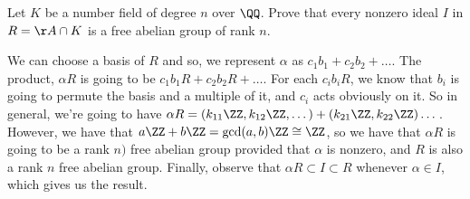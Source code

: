\begin{problem}
Let \(K\) be a number field of degree \(n\) over \(\QQ\). Prove that every nonzero ideal \(I\) in \(R = \AA \cap K\) is a free abelian group of rank \(n\).
\end{problem}
We can choose a basis of \(R\) and so, we represent \(\alpha\) as \(c_1b_1+c_2b_2+ \dots\). The product, \(\alpha R\) is going to be \(c_1b_1R+c_2b_2R+\dots\). For each \(c_ib_iR\), we know that \(b_i\) is going to permute the basis and a multiple of it, and \(c_i\) acts obviously on it. So in general, we're going to have \(\alpha R = (k_{11}\ZZ,k_{12}\ZZ,\dots) + (k_{21}\ZZ,k_{22}\ZZ)\dots\). However, we have that \(a\ZZ+b\ZZ = \gcd(a,b)\ZZ \cong \ZZ\), so we have that \(\alpha R\) is going to be a rank \(n)\) free abelian group provided that \(\alpha\) is nonzero, and \(R\) is also a rank \(n\) free abelian group. Finally, observe that \(\alpha R \subset I \subset R\) whenever \(\alpha \in I\), which gives us the result.

